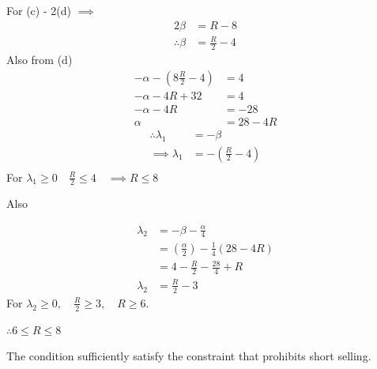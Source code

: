 \documentclass[12pt,a4paper]{article}
\begin{document}
For (c) -  2(d)  $\implies $
\begin{align*}
		2\beta  &=  R  - 8 \\
		\therefore  \beta  &=  \frac{R}{2} - 4
\end{align*}
Also from (d)
\begin{align*}
-\alpha  - \left( 8 \frac{R}{2}  - 4   \right) &=  4\\
-\alpha  - 4R  + 32  &= 4\\
-\alpha  - 4R  &= -28\\
\alpha  &=  28 -  4R
\end{align*}
\begin{align*}
	\therefore  \lambda_1   &= -  \beta \\
	\implies \lambda_1  &=  - \left(  \frac{R}{2}    - 4  \right)\\
\end{align*}
For $ \lambda_1 \ge 0 \quad \frac{R}{2}  \le 4 \quad \implies R  \le 8 $
\begin{spacing}{1.4}
		Also 
\end{spacing}
\begin{align*}
		\lambda_2    &=  - \beta  -  \frac{\alpha}{ 4} \\
		&=  \left(   \frac{\alpha}{ 2}    \right)  -  \frac{1}{4} \left(  28 - 4R  \right)\\
		&=  4  -  \frac{R}{2}    -  \frac{28}{4} + R\\
		\lambda_2  &=  \frac{R}{2}  -3 
\end{align*}
For   $\lambda_2  \ge 0,  \quad  \frac{R}{2}  \ge 3,  \quad R \ge 6.$
\begin{spacing}{1.2}
		$\therefore  6 \le R  \le 8 $
\end{spacing}
The condition sufficiently satisfy  the constraint that prohibits short selling.
\end{document}
